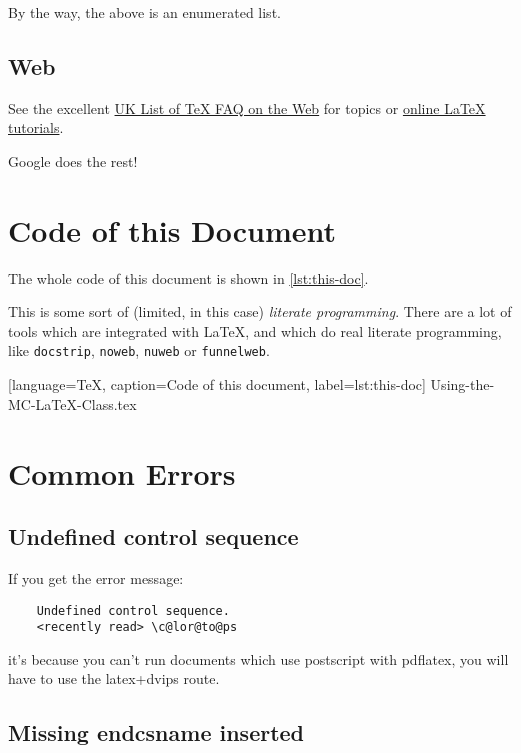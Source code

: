 \documentclass{mcreport}
\begin{document}
\begin{mcnote}
    By the way, the above is an enumerated list.
\end{mcnote}

\subsection{Web}
\label{sec:web}

See the excellent \href{http://www.tex.ac.uk/cgi-bin/texfaq2html}{UK List of
TeX FAQ on the Web} for topics or
\href{http://www.tex.ac.uk/cgi-bin/texfaq2html?label=man-latex}{online LaTeX
tutorials}.

Google does the rest!


\section{Code of this Document}
\label{sec:code-this-document}

The whole code of this document is shown in \autoref{lst:this-doc}.

This is some sort of (limited, in this case) \emph{literate programming}.
There are a lot of tools which are integrated with \LaTeX{}, and which do
real literate programming, like \texttt{docstrip}, \texttt{noweb},
\texttt{nuweb} or \texttt{funnelweb}.


    [language=TeX,%
    caption=Code of this document,%
    label=lst:this-doc]
    {Using-the-MC-LaTeX-Class.tex}


\section{Common Errors}
\label{sec:common-errors}

\subsection{Undefined control sequence}

If you get the error message:

\begin{verbatim}
    Undefined control sequence.
    <recently read> \c@lor@to@ps
\end{verbatim}

it's because you can't run documents which use postscript with pdflatex, you
will have to use the latex+dvips route.

\subsection{Missing endcsname inserted}
\end{document}
